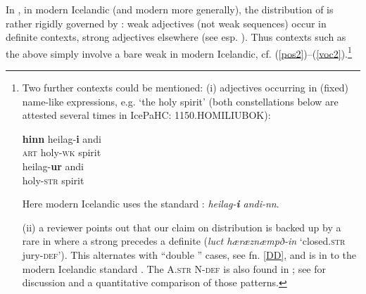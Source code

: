\documentclass[output=paper,colorlinks,citecolor=brown]{langscibook}
\begin{document}
In , in modern Icelandic (and modern  more generally), the distribution of  is rather rigidly governed by : weak adjectives (not weak sequences) occur in definite contexts, strong adjectives elsewhere (see esp. \citealt{Pfaff2017}). Thus contexts such as the above simply  involve a bare weak  in modern Icelandic, cf. (\ref{pos2})--(\ref{voc2}).\footnote{Two further contexts  could be mentioned: (i) adjectives occurring in (fixed) name-like expressions, e.g. `the holy spirit' (both constellations below are attested several times in IcePaHC: 1150.HOMILIUBOK): 
\begin{multicols}{2}
\begin{exe}
\ex \label{nam}    
    \begin{xlist}
         \ex\gll    \textbf{hinn} heilag-\textbf{i} andi  \\ 
         \textsc{art} holy-\textsc{wk} spirit   \\ 
         \ex\gll heilag-\textbf{ur} andi \\ 
         holy-\textsc{str} spirit  \\  
     \end{xlist} 
\end{exe} %
\end{multicols}  
Here modern Icelandic uses the standard : \textit{heilag-\textbf{i} andi-nn}. 

(ii) a reviewer points out that our claim on distribution is backed up by a rare  in   where a strong  precedes a definite  (\textit{luct hæræznæmpð-in} `closed.\textsc{str} jury-\textsc{def}'). This alternates with ``double '' cases, see fn. \ref{DD}, and is in  to the modern Icelandic standard . The  A.\textsc{str N-def} is also found in ; see \citet{Pfaff2019} for discussion and a quantitative comparison of those patterns. 
}     
\end{document}
